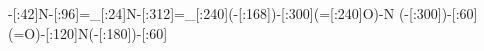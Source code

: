 -[:42]N-[:96]=_[:24]N-[:312]=_[:240](-[:168]\phantom{N})-[:300](=[:240]O)-N%
(-[:300])-[:60](=O)-[:120]N(-[:180])-[:60]